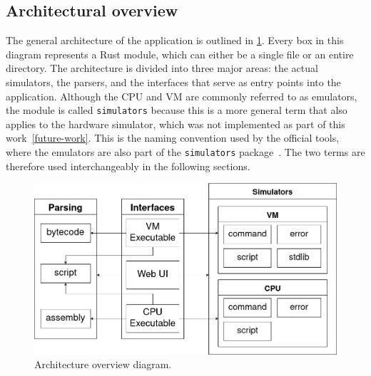 
\subsection{Architectural overview}
The general architecture of the application is outlined in \cref{fig:arch}.
Every box in this diagram represents a Rust module, which can either be a single file or an entire directory.
The architecture is divided into three major areas: the actual simulators, the parsers, and the interfaces that serve as entry points into the application.
Although the CPU and VM are commonly referred to as emulators, the module is called \verb+simulators+ because this is a more general term that also applies to the hardware simulator, which was not implemented as part of this work~\ref{future-work}.
This is the naming convention used by the official tools, where the emulators are also part of the \verb+simulators+ package~\cite{n2tsimulators}.
The two terms are therefore used interchangeably in the following sections.

\begin{center}
  \begin{figure}[ht]
    \centering
    \includegraphics[width=12cm]{fig/architecture.png}
    \caption{Architecture overview diagram.}%
    \label{fig:arch}
  \end{figure}
\end{center}

